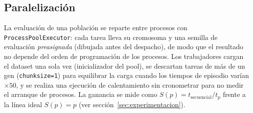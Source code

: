 \subsection{Paralelización}

La evaluación de una población se reparte entre procesos con \texttt{ProcessPoolExecutor}: cada tarea lleva su cromosoma y una semilla de evaluación \emph{preasignada} (dibujada antes del despacho), de modo que el resultado no depende del orden de programación de los procesos. Los trabajadores cargan el dataset una sola vez (inicializador del pool), se descartan tareas de más de un gen (\texttt{chunksize=1}) para equilibrar la carga cuando los tiempos de episodio varían $\times 50$, y se realiza una ejecución de calentamiento sin cronometrar para no medir el arranque de procesos. La ganancia se mide como $S(p) = t_{\text{secuencial}} / t_p$ frente a la línea ideal $S(p) = p$ (ver sección~\ref{sec:experimentacion}).
